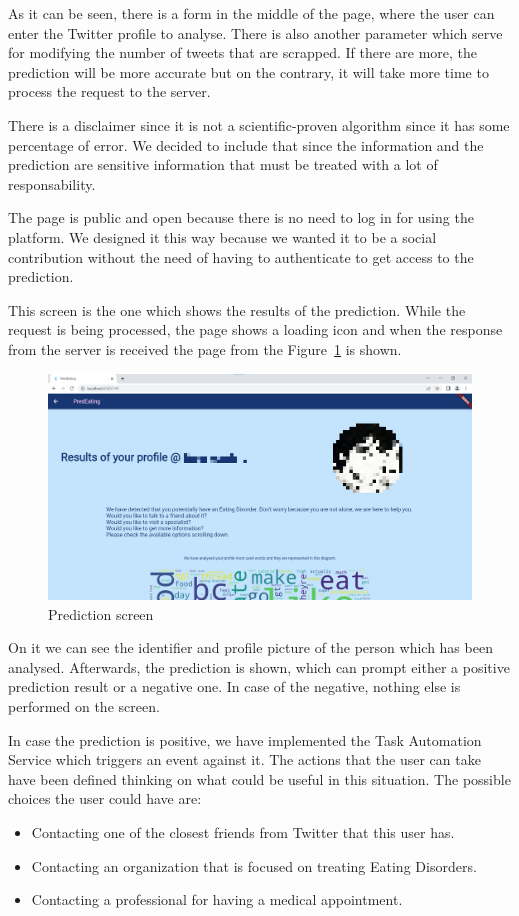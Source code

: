As it can be seen, there is a form in the middle of the page, where the user can enter the Twitter profile to analyse. There is also another parameter which serve for modifying the number of tweets that are scrapped. If there are more, the prediction will be more accurate but on the contrary, it will take more time to process the request to the server.

There is a disclaimer since it is not a scientific-proven algorithm since it has some percentage of error. We decided to include that since the information and the prediction are sensitive information that must be treated with a lot of responsability.

The page is public and open because there is no need to log in for using the platform. We designed it this way because we wanted it to be a social contribution without the need of having to authenticate to get access to the prediction.

This screen is the one which shows the results of the prediction. While the request is being processed, the page shows a loading icon and when the response from the server is received the page from the Figure~\ref{fig:predictionscreen} is shown.

\begin{figure}[!htp]
    \centering
    \includegraphics[scale=0.5]{img/case/predictionscreen.png}
    \caption{Prediction screen}
    \label{fig:predictionscreen}
\end{figure}

On it we can see the identifier and profile picture of the person which has been analysed. Afterwards, the prediction is shown, which can prompt either a positive prediction result or a negative one. In case of the negative, nothing else is performed on the screen.

In case the prediction is positive, we have implemented the Task Automation Service which triggers an event against it. The actions that the user can take have been defined thinking on what could be useful in this situation. The possible choices the user could have are:
\begin{itemize}
    \item Contacting one of the closest friends from Twitter that this user has.
    \item Contacting an organization that is focused on treating Eating Disorders.
    \item Contacting a professional for having a medical appointment.
\end{itemize}

